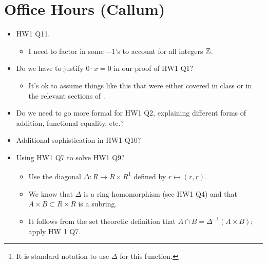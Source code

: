 \documentclass[../notes.tex]{subfiles}
\begin{document}
\section{Office Hours (Callum)}
\begin{itemize}
    \item HW1 Q11.
    \begin{itemize}
        \item I need to factor in some $-1$'s to account for all integers $\mathbb{Z}$.
    \end{itemize}
    \item Do we have to justify $0\cdot x=0$ in our proof of HW1 Q1?
    \begin{itemize}
        \item It's ok to assume things like this that were either covered in class or in the relevant sections of \textcite{bib:DummitFoote}.
    \end{itemize}
    \item Do we need to go more formal for HW1 Q2, explaining different forms of addition, functional equality, etc.?
    \item Additional sophistication in HW1 Q10?
    \item Using HW1 Q7 to solve HW1 Q9?
    \begin{itemize}
        \item Use the diagonal $\Delta:R\to R\times R$\footnote{It is standard notation to use $\Delta$ for this function.} defined by $r\mapsto(r,r)$.
        \item We know that $\Delta$ is a ring homomorphism (see HW1 Q4) and that $A\times B\subset R\times R$ is a subring.
        \item It follows from the set theoretic definition that $A\cap B=\Delta^{-1}(A\times B)$; apply HW 1 Q7.
    \end{itemize}
\end{itemize}
\end{document}
